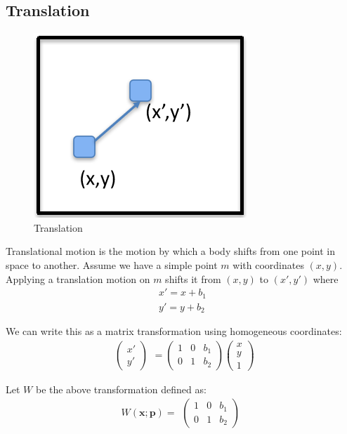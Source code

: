 \documentclass{article}
\begin{document}
\subsection{Translation}
\begin{figure}[h]
  \centering
  \includegraphics{translation.png}
  \caption{Translation}
\end{figure}
Translational motion is the motion by which a body shifts from one point in space to another.
Assume we have a simple point $m$ with coordinates $(x,y)$.
Applying a translation motion on $m$ shifts it from $(x,y)$ to $(x',y')$ where 
\begin{equation}
  \begin{aligned}
    x' = x + b_1 \\
    y' = y + b_2
  \end{aligned}
\end{equation}

We  can write this  as  a matrix  transformation  using homogeneous coordinates: 
\begin{equation}
  \begin{matrix}\begin{pmatrix}x' \\ y' \end{pmatrix}\end{matrix}=
  \begin{pmatrix} 1 & 0 & b_1 \\ 0 & 1 & b_2 \end{pmatrix} 
  \begin{pmatrix} x \\ y \\ 1 \end{pmatrix}
\end{equation}

Let $W$ be the above transformation defined as:
\begin{equation}
  W(\bm{x};\bm{p}) = \begin{matrix}\begin{pmatrix} 1 & 0 & b_1 \\ 0 & 1 & b_2 \end{pmatrix}\end{matrix}
\end{equation}
\end{document}
